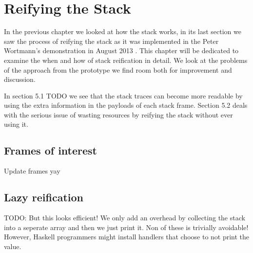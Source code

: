 \chapter{Reifying the Stack}

In the previous chapter we looked at how the stack works, in its
last section we saw the process of reifying the stack as it was
implemented in the Peter Wortmann's demonstration in August 2013
\cite{stack_traces_ticket}. This chapter will be dedicated to examine
the when and how of stack reification in detail. We look at the problems
of the approach from the prototype we find room both for improvement and
discussion.

In section 5.1 TODO we see that the stack traces can become more
readable by using the extra information in the payloads of each stack
frame. Section 5.2 deals with the serious issue of wasting resources by
reifying the stack without ever using it.

\section{Frames of interest}

Update frames yay

\section{Lazy reification}

TODO:
But this looks efficient! We only add an overhead by collecting the
stack into a seperate array and then we just print it. Non of these is
trivially avoidable! However, Haskell programmers might install handlers
that choose to not print the value.
